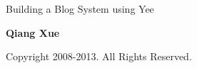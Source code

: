 
\thispagestyle{empty}
\begin{center}
    \bfseries \rule{0cm}{1.5cm} \Huge
    Building a Blog System using Yee
     \vspace{1.5cm}
\end{center}

\begin{center}
    \bfseries \Large Qiang Xue
\end{center}


\begin{center}
   Copyright 2008-2013. All Rights Reserved.
\end{center}

\vfill

\pagebreak \thispagestyle{empty} \cleardoublepage
